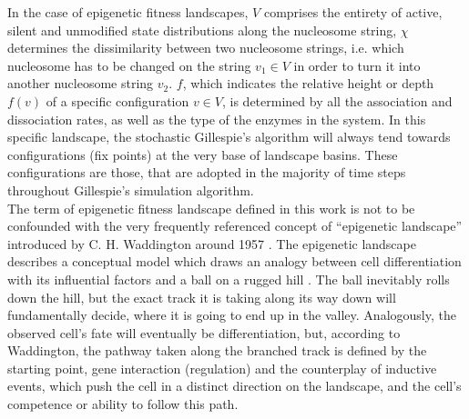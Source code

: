             In the case of epigenetic fitness landscapes, $V$ comprises the entirety of active, silent and unmodified state distributions along the nucleosome string, $\chi$ determines the dissimilarity between two nucleosome strings, i.e. which nucleosome has to be changed on the string $v_1 \in V$ in order to turn it into another nucleosome string $v_2$. $f$, which indicates the relative height or depth $f(v)$ of a specific configuration $v \in V$, is determined by all the association and dissociation rates, as well as the type of the enzymes in the system. In this specific landscape, the stochastic Gillespie's algorithm will always tend towards configurations (fix points) at the very base of landscape basins. These configurations are those, that are adopted in the majority of time steps throughout Gillespie's simulation algorithm.\\ %

            The term of epigenetic fitness landscape defined in this work is not to be confounded with the very frequently referenced concept of “epigenetic landscape” introduced by C. H. Waddington around 1957 \cite{waddington2014strategy}. The epigenetic landscape describes a conceptual model which draws an analogy between cell differentiation with its influential factors and a ball on a rugged hill \cite{epilandscapeDefEmbryo}. The ball inevitably rolls down the hill, but the exact track it is taking along its way down will fundamentally decide, where it is going to end up in the valley. Analogously, the observed cell's fate will eventually be differentiation, but, according to Waddington, the pathway taken along the branched track is defined by the starting point, gene interaction (regulation) and the counterplay of inductive events, which push the cell in a distinct direction on the landscape, and the cell's competence or ability to follow this path.

